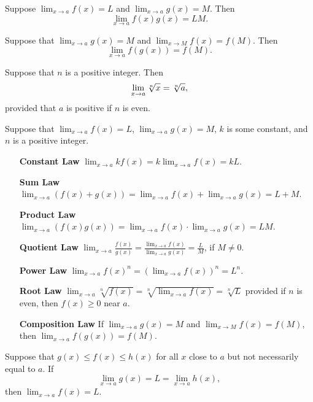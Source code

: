 \documentclass{ximera}
\begin{document}
\begin{theorem}
Suppose $\lim_{x\to a} f(x)=L$ and $\lim_{x\to a}g(x)=M$. Then
\[
\lim_{x\to a} f(x)g(x) = LM.
\]
\end{theorem}

\begin{theorem}
Suppose that $\lim_{x\to a}g(x)=M$ and $\lim_{x\to M}f(x) =
f(M)$. Then
\[
\lim_{x\to a} f(g(x)) = f(M).
\]
\end{theorem}


\begin{theorem}
Suppose that $n$ is a positive integer. Then
$$\lim_{x\to a}\root n\of{x} = \root n\of{a},$$ provided that $a$ is
positive if $n$ is even.
\end{theorem}


\begin{theorem}
Suppose that $\lim_{x\to a}f(x)=L$, $\lim_{x\to a}g(x)=M$, $k$
is some constant, and $n$ is a positive integer.
\begin{itemize}
\item[\textbf{Constant Law}] $\lim_{x\to a} kf(x) = k\lim_{x\to a}f(x)=kL$.
\item[\textbf{Sum Law}] $\lim_{x\to a} (f(x)+g(x)) = \lim_{x\to a}f(x)+\lim_{x\to a}g(x)=L+M$.  
\item[\textbf{Product Law}] $\lim_{x\to a} (f(x)g(x)) = \lim_{x\to a}f(x)\cdot\lim_{x\to a}g(x)=LM$. 
\item[\textbf{Quotient Law}] $\lim_{x\to a} \frac{f(x)}{g(x)} =
  \frac{\lim_{x\to a}f(x)}{\lim_{x\to a}g(x)}=\frac{L}{M}$, if $M\ne0$.
\item[\textbf{Power Law}] $\lim_{x\to a} f(x)^n = \left(\lim_{x\to a}f(x)\right)^n=L^n$.
\item[\textbf{Root Law}] $\lim_{x\to a} \sqrt[n]{f(x)} = \sqrt[n]{\lim_{x\to
    a}f(x)}=\sqrt[n]{L}$ provided if $n$ is even, then $f(x)\ge 0$
  near $a$.
\item[\textbf{Composition Law}] If $\lim_{x\to a}g(x)=M$ and
  $\lim_{x\to M}f(x) = f(M)$, then $\lim_{x\to a} f(g(x)) = f(M)$.
\end{itemize}
\end{theorem}

\begin{theorem}
Suppose that $g(x) \le f(x) \le h(x)$ for all $x$
close to $a$ but not necessarily equal to $a$. If 
\[
\lim_{x\to a} g(x) = L = \lim_{x\to a} h(x),
\] 
then $\lim_{x\to a} f(x) = L$.
\end{theorem}
\end{document}
